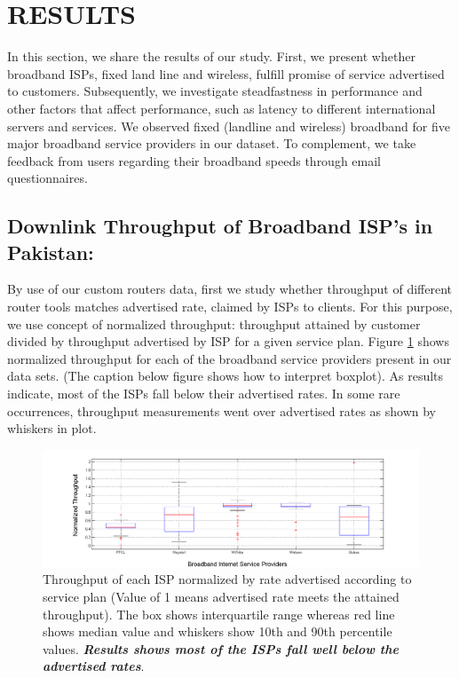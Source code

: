 \documentclass{sig-alternate-10pt}
\begin{document}
\begin{sloppypar}
\section {RESULTS}
In this section, we share the results of our study. First, we present whether broadband ISPs, fixed land line and wireless, fulfill promise of service advertised to customers. Subsequently, we investigate steadfastness in performance and other factors that affect performance, such as latency to different international servers and services.
We observed fixed (landline and wireless) broadband for five major broadband service providers in our dataset. To complement, we take feedback from users regarding their broadband speeds through email questionnaires.
\subsection { Downlink Throughput of Broadband ISP's in Pakistan:}
\indent By use of our custom routers data, first we study whether throughput of different router tools matches advertised rate, claimed by ISPs to clients. For this purpose, we use concept of normalized throughput: throughput attained by customer divided by throughput advertised by ISP for a given service plan. Figure \ref{Fig:normalized} shows normalized throughput for each of the broadband service providers present in our data sets. (The caption below figure shows how to interpret boxplot). As results indicate, most of the ISPs fall below their advertised rates. In some rare occurrences, throughput measurements went over advertised rates as shown by whiskers in plot.
\begin{figure}[t!]
\begin {center}
   \includegraphics[height=0.2 \textheight,width=0.5 \textwidth]{normalized.png}
   \end {center}
 \caption{Throughput of each ISP normalized by rate advertised according to service plan (Value of 1 means advertised rate meets the attained throughput). The box shows interquartile range whereas red line shows median value and whiskers show 10th and 90th  percentile values. \emph{\textbf{Results shows most of the ISPs fall well below the advertised rates}}.}
\label{Fig:normalized}
\end{figure}



\end{sloppypar}
\end{document}
